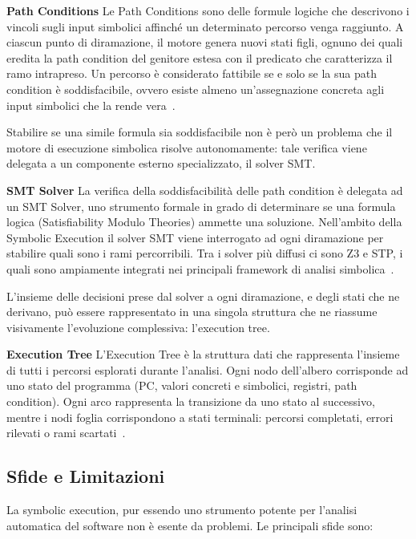 \textbf{Path Conditions} Le Path Conditions sono delle formule logiche che descrivono i vincoli
sugli input simbolici affinché un determinato percorso venga raggiunto. A ciascun punto di
diramazione, il motore genera nuovi stati figli, ognuno dei quali eredita la path condition
del genitore estesa con il predicato che caratterizza il ramo intrapreso. Un percorso
è considerato fattibile se e solo se la sua path condition è soddisfacibile, ovvero esiste
almeno un'assegnazione concreta agli input simbolici che la rende vera~\cite{Cadar_sym_ex_survey}.

Stabilire se una simile formula sia soddisfacibile non è però un problema che il motore di
esecuzione simbolica risolve autonomamente: tale verifica viene delegata a un componente
esterno specializzato, il solver SMT.

\textbf{SMT Solver} La verifica della soddisfacibilità delle path condition è delegata ad un
SMT Solver, uno strumento formale in grado di determinare se una formula logica (Satisfiability
Modulo Theories) ammette una soluzione. Nell'ambito della Symbolic Execution
il solver SMT viene interrogato ad ogni diramazione per stabilire quali sono i rami percorribili. Tra i solver più diffusi ci sono Z3 e STP, i quali
sono ampiamente integrati nei principali framework di analisi simbolica~\cite{SMT_springer}.

L'insieme delle decisioni prese dal solver a ogni diramazione, e degli stati che ne
derivano, può essere rappresentato in una singola struttura che ne riassume
visivamente l'evoluzione complessiva: l'execution tree.

\textbf{Execution Tree} L'Execution Tree è la struttura dati che rappresenta l'insieme di tutti
i percorsi esplorati durante l'analisi. Ogni nodo dell'albero corrisponde ad uno stato
del programma (PC, valori concreti e simbolici, registri, path condition). Ogni arco
rappresenta la transizione da uno stato al successivo, mentre i nodi foglia corrispondono
a stati terminali: percorsi completati, errori rilevati o rami scartati~\cite{Cadar_sym_ex_survey}.

\subsection{Sfide e Limitazioni}
\label{subsec:sfide_e_limitazioni}
La symbolic execution, pur essendo uno strumento potente per l'analisi automatica del software non è
esente da problemi. Le principali sfide sono:

